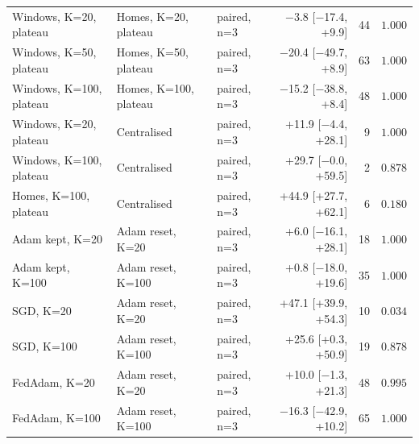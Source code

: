 \begin{tabular}{lllrrr}
Windows, K=20, plateau & Homes, K=20, plateau & paired, n=3 & −3.8 [−17.4, +9.9] & 44 & $1.000$ \\
Windows, K=50, plateau & Homes, K=50, plateau & paired, n=3 & −20.4 [−49.7, +8.9] & 63 & $1.000$ \\
Windows, K=100, plateau & Homes, K=100, plateau & paired, n=3 & −15.2 [−38.8, +8.4] & 48 & $1.000$ \\
Windows, K=20, plateau & Centralised & paired, n=3 & +11.9 [−4.4, +28.1] & 9 & $1.000$ \\
Windows, K=100, plateau & Centralised & paired, n=3 & +29.7 [−0.0, +59.5] & 2 & $0.878$ \\
Homes, K=100, plateau & Centralised & paired, n=3 & +44.9 [+27.7, +62.1] & 6 & $0.180$ \\
Adam kept, K=20 & Adam reset, K=20 & paired, n=3 & +6.0 [−16.1, +28.1] & 18 & $1.000$ \\
Adam kept, K=100 & Adam reset, K=100 & paired, n=3 & +0.8 [−18.0, +19.6] & 35 & $1.000$ \\
SGD, K=20 & Adam reset, K=20 & paired, n=3 & +47.1 [+39.9, +54.3] & 10 & $0.034$ \\
SGD, K=100 & Adam reset, K=100 & paired, n=3 & +25.6 [+0.3, +50.9] & 19 & $0.878$ \\
FedAdam, K=20 & Adam reset, K=20 & paired, n=3 & +10.0 [−1.3, +21.3] & 48 & $0.995$ \\
FedAdam, K=100 & Adam reset, K=100 & paired, n=3 & −16.3 [−42.9, +10.2] & 65 & $1.000$ \\
\bottomrule
\end{tabular}
